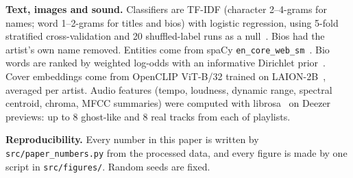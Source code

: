 \documentclass[9pt,twocolumn,twoside]{pnas-new}
\begin{document}
\textbf{Text, images and sound.} Classifiers are TF-IDF (character 2--4-grams for names; word 1--2-grams for titles and bios) with logistic regression, using 5-fold stratified cross-validation and 20 shuffled-label runs as a null~\cite{pedregosa2011sklearn}. Bios had the artist's own name removed. Entities come from spaCy \texttt{en\_core\_web\_sm}~\cite{honnibal2020spacy}. Bio words are ranked by weighted log-odds with an informative Dirichlet prior~\cite{monroe2008fightin}. Cover embeddings come from OpenCLIP ViT-B/32 trained on LAION-2B~\cite{cherti2023openclip}, averaged per artist. Audio features (tempo, loudness, dynamic range, spectral centroid, chroma, MFCC summaries) were computed with librosa~\cite{mcfee2015librosa} on \nAudio{} Deezer previews: up to 8 ghost-like and 8 real tracks from each of \nAudioPlaylists{} playlists.

\textbf{Reproducibility.} Every number in this paper is written by \texttt{src/paper\_numbers.py} from the processed data, and every figure is made by one script in \texttt{src/figures/}. Random seeds are fixed.


\end{document}
